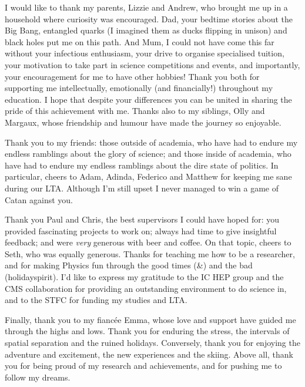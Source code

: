 I would like to thank my parents, Lizzie and Andrew, who brought me up in a household where curiosity was encouraged. Dad, your bedtime stories about the Big Bang, entangled quarks (I imagined them as ducks flipping in unison) and black holes put me on this path. And Mum, I could not have come this far without your infectious enthusiasm, your drive to organise specialised tuition, your motivation to take part in science competitions and events, and importantly, your encouragement for me to have other hobbies! Thank you both for supporting me intellectually, emotionally (and financially!) throughout my education. I hope that despite your differences you can be united in sharing the pride of this achievement with me. Thanks also to my siblings, Olly and Margaux, whose friendship and humour have made the journey so enjoyable.

Thank you to my friends: those outside of academia, who have had to endure my endless ramblings about the glory of science; and those inside of academia, who have had to endure my endless ramblings about the dire state of politics. In particular, cheers to Adam, Adinda, Federico and Matthew for keeping me sane during our LTA. Although I'm still upset I never managed to win a game of Catan against you.

Thank you Paul and Chris, the best supervisors I could have hoped for: you provided fascinating projects to work on; always had time to give insightful feedback; and were \emph{very} generous with beer and coffee. On that topic, cheers to Seth, who was equally generous. Thanks for teaching me how to be a researcher, and for making Physics fun through the good times (\&) and the bad (holidayspirit). I'd like to express my gratitude to the IC HEP group and the CMS collaboration for providing an outstanding environment to do science in, and to the STFC for funding my studies and LTA. 

Finally, thank you to my fianc\'ee Emma, whose love and support have guided me through the highs and lows. Thank you for enduring the stress, the intervals of spatial separation and the ruined holidays. Conversely, thank you for enjoying the adventure and excitement, the new experiences and the skiing. Above all, thank you for being proud of my research and achievements, and for pushing me to follow my dreams. 
